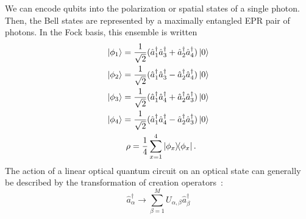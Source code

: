 \documentclass[aps,pra,twocolumn,showpacs,superscriptaddress,floatfix,10pt]{revtex4}
\begin{document}
We can encode qubits into the polarization or spatial states of a single photon. Then, the Bell states are represented by a maximally entangled EPR pair of photons. In the Fock basis, this ensemble is written
\begin{eqnarray}
\label{Bell States Creation Operator 1}
\ket{\phi_1} = \frac{1}{\sqrt{2}} (\hat{a}_1^\dagger \hat{a}_3^\dagger + \hat{a}_2^\dagger \hat{a}_4^\dagger) \ket{0} \\
\label{Bell States Creation Operator 2}
\ket{\phi_2} = \frac{1}{\sqrt{2}} (\hat{a}_1^\dagger \hat{a}_3^\dagger - \hat{a}_2^\dagger \hat{a}_4^\dagger) \ket{0} \\
\label{Bell States Creation Operator 3}
\ket{\phi_3} = \frac{1}{\sqrt{2}} (\hat{a}_1^\dagger \hat{a}_4^\dagger + \hat{a}_2^\dagger \hat{a}_3^\dagger) \ket{0} \\
\label{Bell States Creation Operator 4}
\ket{\phi_4} = \frac{1}{\sqrt{2}} (\hat{a}_1^\dagger \hat{a}_4^\dagger - \hat{a}_2^\dagger \hat{a}_3^\dagger) \ket{0} \\
\label{Bell State Ensemble}
\rho = \frac{1}{4} \sum_{x=1}^{4} \outerproduct{\phi_x}{\phi_x}. \quad  \enspace
\end{eqnarray}
The action of a linear optical quantum circuit on an optical state can generally be described by the transformation of creation operators~\cite{Reck}:
\begin{equation}
\label{LO Creation Operator Transformation}
\hat{a}^\dagger_\alpha \rightarrow \sum_{\beta=1}^{M} U_{\alpha,\beta} \hat{a}^\dagger_\beta
\end{equation}
\end{document}

